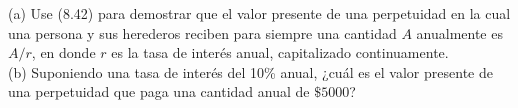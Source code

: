 \item (a) Use (8.42) para demostrar que el valor presente de una perpetuidad en la cual una persona y sus herederos reciben para siempre una cantidad $A$ anualmente es $A/r$, en donde $r$ es la tasa de interés anual, capitalizado continuamente.\\
    (b) Suponiendo una tasa de interés del 10\% anual, ¿cuál es el valor presente de una perpetuidad que paga una cantidad anual de $\$5000$?
